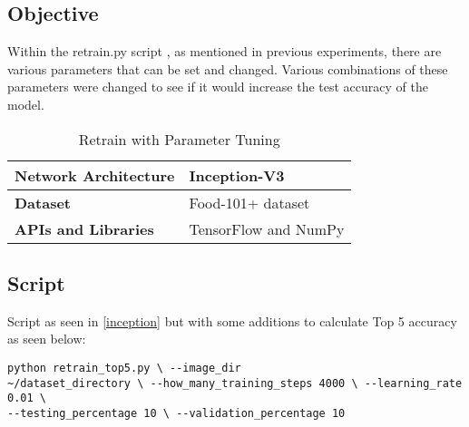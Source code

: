 \tocless\subsection{Objective}
Within the retrain.py script \parencite{retrainInception}, as mentioned in
previous experiments, there are various parameters that can be set and changed.
Various combinations of these parameters were changed to see if it would increase the
test accuracy of the model.

\begin{table}[h]
\centering
\caption{Retrain with Parameter Tuning}
\label{my-label}
\begin{tabular}{|l|p{8cm}|}
\hline
\textbf{Network Architecture} & Inception-V3           \\ \hline
\textbf{Dataset}              & Food-101+ dataset \\ \hline
\textbf{APIs and Libraries}   & TensorFlow and NumPy                                                       \\ \hline
\end{tabular}
\end{table}

\tocless\subsection{Script}
Script as seen in \ref{inception} but with some additions to calculate Top 5 accuracy as seen
below:

\begin{lstlisting}
python retrain_top5.py \ --image_dir
~/dataset_directory \ --how_many_training_steps 4000 \ --learning_rate 0.01 \
--testing_percentage 10 \ --validation_percentage 10
\end{lstlisting}

